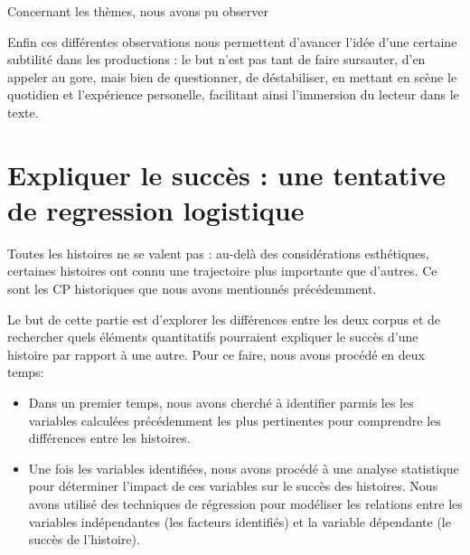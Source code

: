 \documentclass[12pt,a4paper,oneside,titlepage]{book} %
\begin{document}
\par Concernant les thèmes, nous avons pu observer 

\par Enfin ces différentes observations nous permettent d'avancer l'idée d'une certaine subtilité dans les productions : le but n'est pas tant de faire sursauter, d'en appeler au gore, mais bien de questionner, de déstabiliser, en mettant en scène le quotidien et l'expérience personelle, facilitant ainsi l'immersion du lecteur dans le texte.




\chapter[Expliquer le succès]{Expliquer le succès : une tentative de regression logistique}

Toutes les histoires ne se valent pas : au-delà des considérations esthétiques, certaines histoires ont connu une trajectoire plus importante que d'autres. Ce sont les CP historiques que nous avons mentionnés précédemment.

Le but de cette partie est d'explorer les différences entre les deux corpus et de rechercher quels éléments quantitatifs pourraient expliquer le succès d'une histoire par rapport à une autre. Pour ce faire, nous avons procédé en deux temps:
\begin{itemize}
\item  Dans un premier temps, nous avons cherché à identifier parmis les les variables calculées précédemment les plus pertinentes pour comprendre les différences entre les histoires. 

\item  Une fois les variables identifiées, nous avons procédé à une analyse statistique pour déterminer l'impact de ces variables sur le succès des histoires. Nous avons utilisé des techniques de régression pour modéliser les relations entre les variables indépendantes (les facteurs identifiés) et la variable dépendante (le succès de l'histoire). 
\end{itemize}
\end{document}
